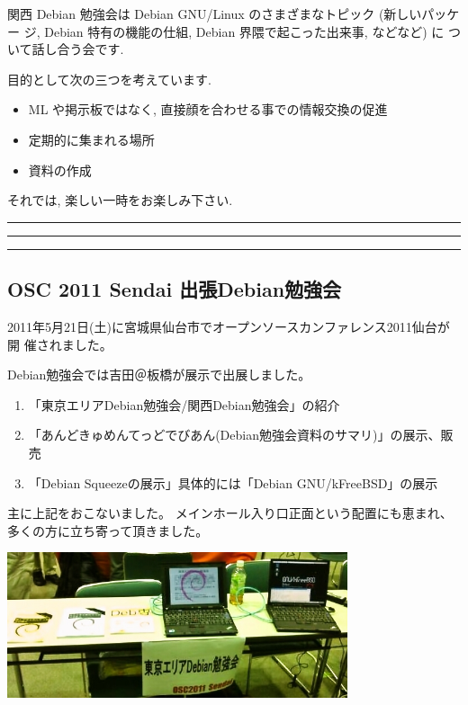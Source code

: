\documentclass[mingoth,a4paper]{jsarticle}
\begin{document}
関西 Debian 勉強会は Debian GNU/Linux のさまざまなトピック (新しいパッケー
ジ, Debian 特有の機能の仕組, Debian 界隈で起こった出来事, などなど) に
ついて話し合う会です.

目的として次の三つを考えています.
\begin{itemize}
      \item ML や掲示板ではなく, 直接顔を合わせる事での情報交換の促進
      \item 定期的に集まれる場所
      \item 資料の作成
\end{itemize}

それでは, 楽しい一時をお楽しみ下さい.

\clearpage

\begin{minipage}[b]{0.2\hsize}
 {}
\end{minipage}
\begin{minipage}[b]{0.8\hsize}
\hrule
\vspace{2mm}
\hrule
\setcounter{tocdepth}{1}
\tableofcontents
\vspace{2mm}
\hrule
\end{minipage}



\subsection{OSC 2011 Sendai 出張Debian勉強会}

2011年5月21日(土)に宮城県仙台市でオープンソースカンファレンス2011仙台が開
催されました。

Debian勉強会では吉田＠板橋が展示で出展しました。
\begin{enumerate}
\item「東京エリアDebian勉強会/関西Debian勉強会」の紹介
\item「あんどきゅめんてっどでびあん(Debian勉強会資料のサマリ)」の展示、販売
\item「Debian Squeezeの展示」具体的には「Debian GNU/kFreeBSD」の展示
\end{enumerate}
主に上記をおこないました。
メインホール入り口正面という配置にも恵まれ、多くの方に立ち寄って頂きました。

\begin{center}
\includegraphics[width=10cm]{image201106/oscsendai.jpg}
\end{center}
\end{document}
